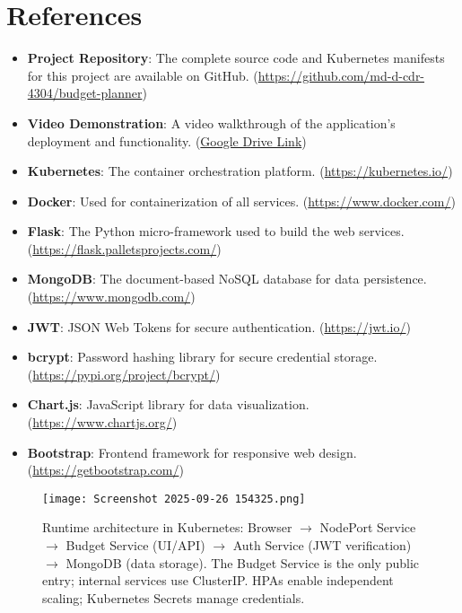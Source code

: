 \documentclass[conference]{IEEEtran}
\begin{document}
\section{\textbf{References}}
\begin{itemize}
    \item \textbf{Project Repository}: The complete source code and Kubernetes manifests for this project are available on GitHub. (\href{https://github.com/md-d-cdr-4304/budget-planner}{https://github.com/md-d-cdr-4304/budget-planner})
    \item \textbf{Video Demonstration}: A video walkthrough of the application's deployment and functionality. (\href{https://drive.google.com/drive/folders/1wueHDj2LGUJuBejR03_hyvfuyfl1XE6-?usp=sharing}{Google Drive Link})
    \item \textbf{Kubernetes}: The container orchestration platform. (\href{https://kubernetes.io/}{https://kubernetes.io/})
    \item \textbf{Docker}: Used for containerization of all services. (\href{https://www.docker.com/}{https://www.docker.com/})
    \item \textbf{Flask}: The Python micro-framework used to build the web services. (\href{https://flask.palletsprojects.com/}{https://flask.palletsprojects.com/})
    \item \textbf{MongoDB}: The document-based NoSQL database for data persistence. (\href{https://www.mongodb.com/}{https://www.mongodb.com/})
    \item \textbf{JWT}: JSON Web Tokens for secure authentication. (\href{https://jwt.io/}{https://jwt.io/})
    \item \textbf{bcrypt}: Password hashing library for secure credential storage. (\href{https://pypi.org/project/bcrypt/}{https://pypi.org/project/bcrypt/})
    \item \textbf{Chart.js}: JavaScript library for data visualization. (\href{https://www.chartjs.org/}{https://www.chartjs.org/})
    \item \textbf{Bootstrap}: Frontend framework for responsive web design. (\href{https://getbootstrap.com/}{https://getbootstrap.com/})
\end{itemize}
\balance

\vspace{1cm}
\begin{figure*}[!b]
  \centering
  \texttt{[image: Screenshot 2025-09-26 154325.png]}%
  \caption{Runtime architecture in Kubernetes: Browser $\rightarrow$ NodePort Service $\rightarrow$ Budget Service (UI/API) $\rightarrow$ Auth Service (JWT verification) $\rightarrow$ MongoDB (data storage). The Budget Service is the only public entry; internal services use ClusterIP. HPAs enable independent scaling; Kubernetes Secrets manage credentials.}
  \label{fig:arch}
\end{figure*}
\end{document}
